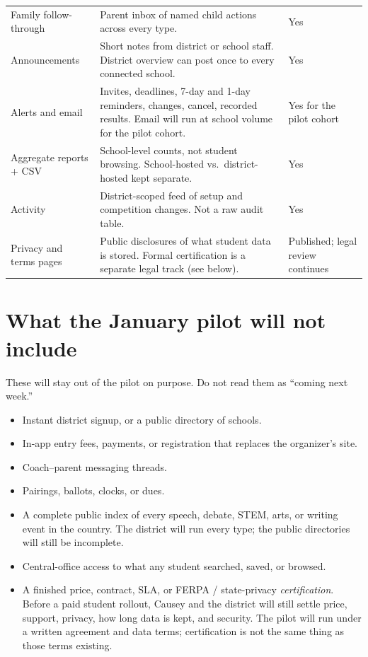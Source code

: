 \documentclass[11pt]{article}
\begin{document}
\begin{longtable}{@{}L{0.28\textwidth} L{0.44\textwidth} L{0.22\textwidth}@{}}
  \addlinespace
  Family follow-through
    & Parent inbox of named child actions across every type.
    & Yes \\
  \addlinespace
  Announcements
    & Short notes from district or school staff. District overview can post once to every connected school.
    & Yes \\
  \addlinespace
  Alerts and email
    & Invites, deadlines, 7-day and 1-day reminders, changes, cancel, recorded results. Email will run at school volume for the pilot cohort.
    & Yes for the pilot cohort \\
  \addlinespace
  Aggregate reports + CSV
    & School-level counts, not student browsing. School-hosted vs.\ district-hosted kept separate.
    & Yes \\
  \addlinespace
  Activity
    & District-scoped feed of setup and competition changes. Not a raw audit table.
    & Yes \\
  \addlinespace
  Privacy and terms pages
    & Public disclosures of what student data is stored. Formal certification is a separate legal track (see below).
    & Published; legal review continues \\
\end{longtable}

\section*{What the January pilot will not include}

These will stay out of the pilot on purpose. Do not read them as ``coming next week.''

\begin{itemize}
  \item Instant district signup, or a public directory of schools.
  \item In-app entry fees, payments, or registration that replaces the organizer's site.
  \item Coach--parent messaging threads.
  \item Pairings, ballots, clocks, or dues.
  \item A complete public index of every speech, debate, STEM, arts, or writing event in the country. The district will run every type; the public directories will still be incomplete.
  \item Central-office access to what any student searched, saved, or browsed.
  \item A finished price, contract, SLA, or FERPA / state-privacy \emph{certification}. Before a paid student rollout, Causey and the district will still settle price, support, privacy, how long data is kept, and security. The pilot will run under a written agreement and data terms; certification is not the same thing as those terms existing.
\end{itemize}
\end{document}
